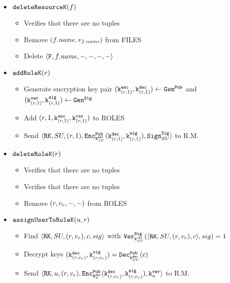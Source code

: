 {\begin{itemize}
        \item \( \deleteResourceFK \)
        \begin{itemize}
            \item Verifies that there are no tuples  
            \item Remove \( (\file.\fname, v_{\file.\fname}) \) from FILES
            \item Delete \( \ft{\file.\fname}{-}{-}{-}{-} \)
        \end{itemize}

        \item \( \addRoleFK \)
        \begin{itemize}
            \item Generate encryption key pair \( \keyencpairr{1} \leftarrow \genpub \) and \( \keysigpairr{1} \leftarrow \gensig \)
            \item Add \( (r, 1, \keyencr{1}, \keyverr{1}) \) to ROLES
            \item Send \( \rt{SU}{(r, 1)}{\encpub{\keyenc{SU}}{\keydecr{1}, \keysigr{1}}}{\sig{SU}} \) to R.M.
        \end{itemize}

        \item \( \deleteRoleFK \)
        \begin{itemize}
            \item Verifies that there are no tuples  
            \item Verifies that there are no tuples  
            \item Remove \( (\role, \rolev, -, -) \) from ROLES
        \end{itemize}

        \item \( \assignUserToRoleFK \)
        \begin{itemize}
            \item Find \( \rt{SU}{(\role, \rolev)}{c}{sig} \) with \( \verifysig{\keyver{SU}}{\rts{SU}{(\role, \rolev)}{c},sig} \)
            \item Decrypt keys \( (\keydecr{\rolev}, \keysigr{\rolev}) = \decpub{\keydec{SU}}{c} \)
            \item Send \( \rt{\user}{(\role, \rolev)}{\encpub{\keyencu}{\keydecr{\rolev}, \keysigr{\rolev}}}{\keyveru} \) to R.M.
        \end{itemize}


\end{itemize}}
